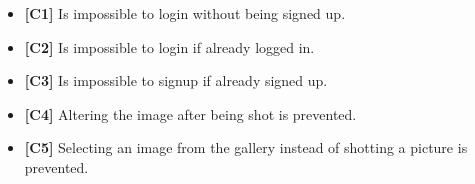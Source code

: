 \begin{itemize}
		\item \textbf{[\hypertarget{C1}{C1}]} Is impossible to login without being signed up. 
		\item \textbf{[\hypertarget{C2}{C2}]} Is impossible to login if already logged in. 
		\item \textbf{[\hypertarget{C3}{C3}]} Is impossible to signup if already signed up.
		\item \textbf{[\hypertarget{C4}{C4}]} Altering the image after being shot is prevented. 
		\item \textbf{[\hypertarget{C5}{C5}]} Selecting an image from the gallery instead of shotting a picture is prevented.
	\end{itemize}
